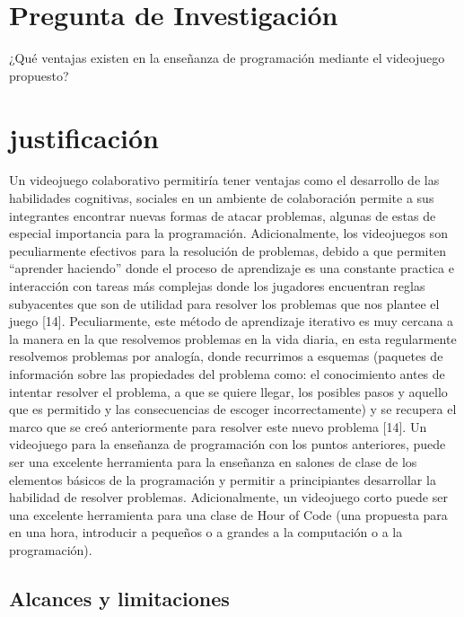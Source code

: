 \section{Pregunta de Investigación}
¿Qué ventajas existen en la enseñanza de programación mediante el videojuego propuesto?

\section{justificación}
Un videojuego colaborativo permitiría tener ventajas como el desarrollo de las habilidades cognitivas, sociales en un ambiente de colaboración permite a sus integrantes encontrar nuevas formas de atacar problemas, algunas de estas de especial importancia para la programación. 
Adicionalmente, los videojuegos son peculiarmente efectivos para la resolución de problemas, debido a que permiten “aprender haciendo” donde el proceso de aprendizaje es una constante practica e interacción con tareas más complejas donde los jugadores encuentran reglas subyacentes que son de utilidad para resolver los problemas que nos plantee el juego [14]. Peculiarmente, este método de aprendizaje iterativo es muy cercana a la manera en la que resolvemos problemas en la vida diaria, en esta regularmente resolvemos problemas por analogía, donde recurrimos a esquemas (paquetes de información sobre las propiedades del problema como: el conocimiento antes de intentar resolver el problema, a que se quiere llegar, los posibles pasos y aquello que es permitido y las consecuencias de escoger incorrectamente) y se recupera el marco que se creó anteriormente para resolver este nuevo problema [14].
Un videojuego para la enseñanza de programación con los puntos anteriores, puede ser una excelente herramienta para la enseñanza en salones de clase de los elementos básicos de la programación y permitir a principiantes desarrollar la habilidad de resolver problemas. Adicionalmente, un videojuego corto puede ser una excelente herramienta para una clase de Hour of Code (una propuesta para en una hora, introducir a pequeños o a grandes a la computación o a la programación).


\subsection{Alcances y limitaciones}
